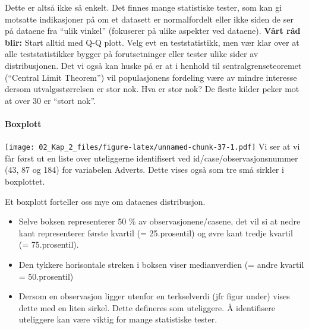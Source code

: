 \documentclass[
]{article}
\newenvironment{Shaded}{\begin{snugshade}}{\end{snugshade}}
\newcommand{\AttributeTok}[1]{\textcolor[rgb]{0.77,0.63,0.00}{#1}}
\newcommand{\CommentTok}[1]{\textcolor[rgb]{0.56,0.35,0.01}{\textit{#1}}}
\newcommand{\ConstantTok}[1]{\textcolor[rgb]{0.00,0.00,0.00}{#1}}
\newcommand{\DecValTok}[1]{\textcolor[rgb]{0.00,0.00,0.81}{#1}}
\newcommand{\FunctionTok}[1]{\textcolor[rgb]{0.00,0.00,0.00}{#1}}
\newcommand{\NormalTok}[1]{#1}
\newcommand{\SpecialCharTok}[1]{\textcolor[rgb]{0.00,0.00,0.00}{#1}}
\newcommand{\StringTok}[1]{\textcolor[rgb]{0.31,0.60,0.02}{#1}}
\providecommand{\tightlist}{%
  \setlength{\itemsep}{0pt}\setlength{\parskip}{0pt}}
\begin{document}
Dette er altså ikke så enkelt. Det finnes mange statistiske tester, som kan gi motsatte indikasjoner på om et datasett er normalfordelt eller ikke siden de ser på dataene fra ``ulik vinkel'' (fokuserer på ulike aspekter ved dataene). \textbf{Vårt råd blir:} Start alltid med Q-Q plott. Velg evt en teststatistikk, men vær klar over at alle teststatistikker bygger på forutsetninger eller tester ulike sider av distribusjonen. Det vi også kan huske på er at i henhold til sentralgrenseteoremet (``Central Limit Theorem'') vil populasjonens fordeling være av mindre interesse dersom utvalgsstørrelsen er stor nok. Hva er stor nok? De fleste kilder peker mot at over 30 er ``stort nok''.

\hypertarget{boxplott}{%
\paragraph{Boxplott}\label{boxplott}}

\begin{Shaded}
\end{Shaded}

\texttt{[image: 02\_Kap\_2\_files/figure-latex/unnamed-chunk-37-1.pdf]}
Vi ser at vi får først ut en liste over uteliggerne identifisert ved id/case/observasjonsnummer (43, 87 og 184) for variabelen Adverts. Dette vises også som tre små sirkler i boxplottet.

Et boxplott forteller oss mye om dataenes distribusjon.

\begin{itemize}
\tightlist
\item
  Selve boksen representerer 50 \% av observasjonene/casene, det vil si at nedre kant representerer første kvartil (= 25.prosentil) og øvre kant tredje kvartil (= 75.prosentil).
\item
  Den tykkere horisontale streken i boksen viser medianverdien (= andre kvartil = 50.prosentil)
\item
  Dersom en observasjon ligger utenfor en terkselverdi (jfr figur under) vises dette med en liten sirkel. Dette defineres som uteliggere. Å identifisere uteliggere kan være viktig for mange statistiske tester.
\end{itemize}
\end{document}
